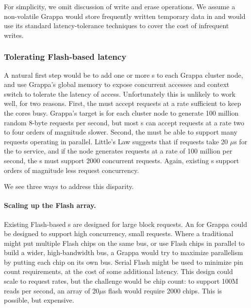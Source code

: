 For simplicity, we omit discussion of write and erase operations. We
assume a non-volatile Grappa would store frequently written temporary
data in  and would use its standard latency-tolerance techniques
to cover the cost of infrequent writes.

\subsubsection{Tolerating Flash-based  latency} 
A natural first step would be to add one or more s to each Grappa
cluster node, and use Grappa's global memory  to expose concurrent
accesses and context switch to tolerate the latency of 
access. Unfortunately this is unlikely to work well, for two
reasons. First, the  must accept requests at a rate sufficient to
keep the cores busy. Grappa's target is for each cluster node to
generate 100 million random 8-byte requests per second, but most s
can accept requests at a rate two to four orders of magnitude slower.
Second, the  must be able to support many requests operating in
parallel. Little's Law suggests that if requests take 20 $\mu$s for
the  to service, and if the node generates requests at a rate of
100 million per second, the s must support 2000 concurrent
requests. Again, existing s support orders of magnitude less request concurrency.

We see three ways to address this disparity.

\paragraph{Scaling up the Flash array.}
Existing Flash-based s are designed for large block requests. An
 for Grappa could be designed to support high concurrency, small
requests. Where a traditional  might put multiple Flash chips on
the same bus, or use Flash chips in parallel to build a wider,
high-bandwidth bus, a Grappa  would try to maximize parallelism by
putting each chip on its own bus. Serial Flash might be used to
minimize pin count requirements, at the cost of some additional
latency. This design could scale to request rates, but the challenge
would be chip count: to support 100M reads per second, an array of
20$\mu$s flash would require 2000 chips. This is possible, but expensive.

